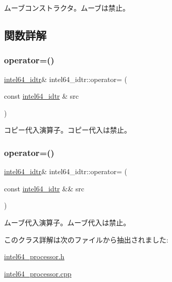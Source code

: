 ムーブコンストラクタ。ムーブは禁止。 

\subsection{関数詳解}
\hypertarget{classintel64__idtr_a37c1a4964da1ffe04fc2235500d86a20}{}\label{classintel64__idtr_a37c1a4964da1ffe04fc2235500d86a20} 
\subsubsection{\texorpdfstring{operator=()}{operator=()}\hspace{0.1cm}{\footnotesize\ttfamily [1/2]}}
{\footnotesize\ttfamily \hyperlink{classintel64__idtr}{intel64\+\_\+idtr}\& intel64\+\_\+idtr\+::operator= (\begin{DoxyParamCaption}\item[{const \hyperlink{classintel64__idtr}{intel64\+\_\+idtr} \&}]{src }\end{DoxyParamCaption})\hspace{0.3cm}{\ttfamily [delete]}}

コピー代入演算子。コピー代入は禁止。 \hypertarget{classintel64__idtr_af03603e60568900dd8006e18fa22069b}{}\label{classintel64__idtr_af03603e60568900dd8006e18fa22069b} 
\subsubsection{\texorpdfstring{operator=()}{operator=()}\hspace{0.1cm}{\footnotesize\ttfamily [2/2]}}
{\footnotesize\ttfamily \hyperlink{classintel64__idtr}{intel64\+\_\+idtr}\& intel64\+\_\+idtr\+::operator= (\begin{DoxyParamCaption}\item[{const \hyperlink{classintel64__idtr}{intel64\+\_\+idtr} \&\&}]{src }\end{DoxyParamCaption})\hspace{0.3cm}{\ttfamily [delete]}}

ムーブ代入演算子。ムーブ代入は禁止。 

このクラス詳解は次のファイルから抽出されました\+:\begin{DoxyCompactItemize}
\item 
\hyperlink{intel64__processor_8h}{intel64\+\_\+processor.\+h}\item 
\hyperlink{intel64__processor_8cpp}{intel64\+\_\+processor.\+cpp}\end{DoxyCompactItemize}
